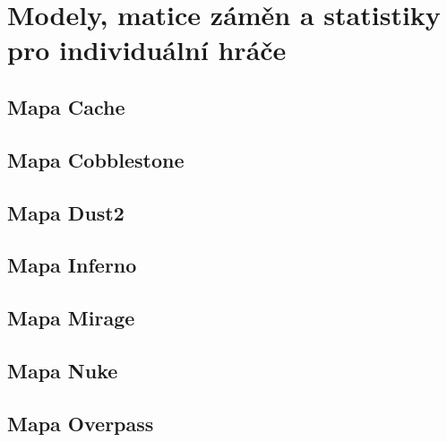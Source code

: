 \chapter{Modely, matice záměn a statistiky pro individuální hráče} \label{chap:ap02}
\section{Mapa Cache}



\newpage

\section{Mapa Cobblestone}



\newpage

\section{Mapa Dust2}



\newpage

\section{Mapa Inferno}



\newpage

\section{Mapa Mirage}



\newpage

\section{Mapa Nuke}



\newpage

\section{Mapa Overpass}



\newpage

